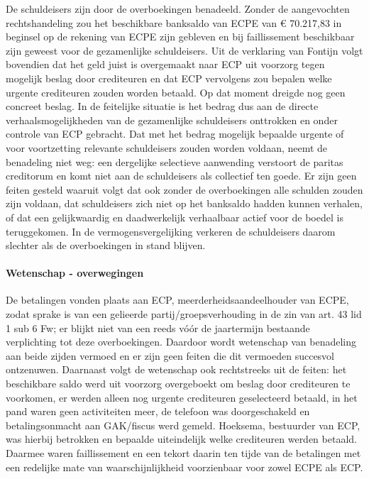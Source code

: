\documentclass[
  dutch,
  a4paper,
]{article}
\begin{document}
De schuldeisers zijn door de overboekingen benadeeld. Zonder de aangevochten rechtshandeling zou het beschikbare banksaldo van ECPE van € 70.217,83 in beginsel op de rekening van ECPE zijn gebleven en bij faillissement beschikbaar zijn geweest voor de gezamenlijke schuldeisers. Uit de verklaring van Fontijn volgt bovendien dat het geld juist is overgemaakt naar ECP uit voorzorg tegen mogelijk beslag door crediteuren en dat ECP vervolgens zou bepalen welke urgente crediteuren zouden worden betaald. Op dat moment dreigde nog geen concreet beslag. In de feitelijke situatie is het bedrag dus aan de directe verhaalsmogelijkheden van de gezamenlijke schuldeisers onttrokken en onder controle van ECP gebracht. Dat met het bedrag mogelijk bepaalde urgente of voor voortzetting relevante schuldeisers zouden worden voldaan, neemt de benadeling niet weg: een dergelijke selectieve aanwending verstoort de paritas creditorum en komt niet aan de schuldeisers als collectief ten goede. Er zijn geen feiten gesteld waaruit volgt dat ook zonder de overboekingen alle schulden zouden zijn voldaan, dat schuldeisers zich niet op het banksaldo hadden kunnen verhalen, of dat een gelijkwaardig en daadwerkelijk verhaalbaar actief voor de boedel is teruggekomen. In de vermogensvergelijking verkeren de schuldeisers daarom slechter als de overboekingen in stand blijven.

\paragraph{Wetenschap - overwegingen}\label{wetenschap---overwegingen-52}

De betalingen vonden plaats aan ECP, meerderheidsaandeelhouder van ECPE, zodat sprake is van een gelieerde partij/groepsverhouding in de zin van art. 43 lid 1 sub 6 Fw; er blijkt niet van een reeds vóór de jaartermijn bestaande verplichting tot deze overboekingen. Daardoor wordt wetenschap van benadeling aan beide zijden vermoed en er zijn geen feiten die dit vermoeden succesvol ontzenuwen. Daarnaast volgt de wetenschap ook rechtstreeks uit de feiten: het beschikbare saldo werd uit voorzorg overgeboekt om beslag door crediteuren te voorkomen, er werden alleen nog urgente crediteuren geselecteerd betaald, in het pand waren geen activiteiten meer, de telefoon was doorgeschakeld en betalingsonmacht aan GAK/fiscus werd gemeld. Hoeksema, bestuurder van ECP, was hierbij betrokken en bepaalde uiteindelijk welke crediteuren werden betaald. Daarmee waren faillissement en een tekort daarin ten tijde van de betalingen met een redelijke mate van waarschijnlijkheid voorzienbaar voor zowel ECPE als ECP.
\end{document}

